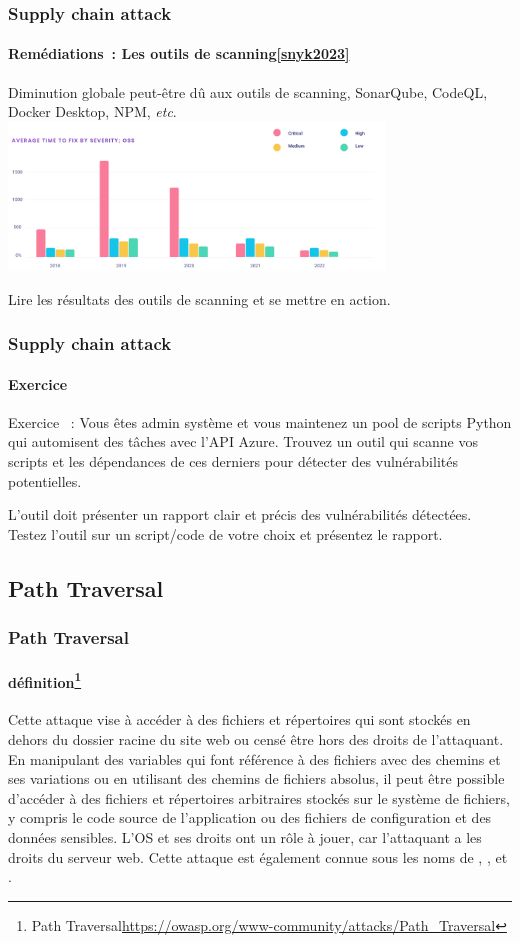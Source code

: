 \documentclass{beamer}
\begin{document}
    \begin{frame}
        \frametitle{Supply chain attack}
        \framesubtitle{Remédiations~: Les outils de scanning\cref{snyk2023}}
        \transdissolve
        Diminution globale peut-être dû aux outils de scanning, SonarQube, CodeQL, Docker Desktop, NPM, \textit{etc}.
        \bigbreak
        \centering
        \includegraphics[width=10cm]{image/vuln-time-to-fix}
        \flushleft
        \begin{dangercolorbox}
            Lire les résultats des outils de scanning et se mettre en action.
        \end{dangercolorbox}
    \end{frame}

    \begin{frame}
        \frametitle{Supply chain attack}
        \framesubtitle{Exercice}
        Exercice \execcounterdispinc{}~:
        Vous êtes admin système et vous maintenez un pool de scripts Python qui automisent des tâches avec l'API Azure.
        \bigbreak
        Trouvez un outil qui scanne vos scripts et les dépendances de ces derniers pour détecter des vulnérabilités potentielles.

        L'outil doit présenter un rapport clair et précis des vulnérabilités détectées.
        \bigbreak
        Testez l'outil sur un script/code de votre choix et présentez le rapport.
    \end{frame}

    \subsection{Path Traversal}\label{path-traversal}


    \begin{frame}
        \frametitle{Path Traversal}
        \framesubtitle{définition\footnote{Path Traversal\url{https://owasp.org/www-community/attacks/Path_Traversal}}}
        \transdissolve
        Cette attaque vise à accéder à des fichiers et répertoires qui sont stockés en dehors du dossier racine du site web ou censé être hors des droits de l'attaquant.
        En manipulant des variables qui font référence à des fichiers avec des chemins  et ses variations ou en utilisant des chemins de fichiers absolus, il peut être possible d'accéder à des fichiers et répertoires arbitraires stockés sur le système de fichiers, y compris le code source de l'application ou des fichiers de configuration et des données sensibles.
        L'OS et ses droits ont un rôle à jouer, car l'attaquant a les droits du serveur web.
        \bigbreak
        Cette attaque est également connue sous les noms de , ,  et .
    \end{frame}
\end{document}

